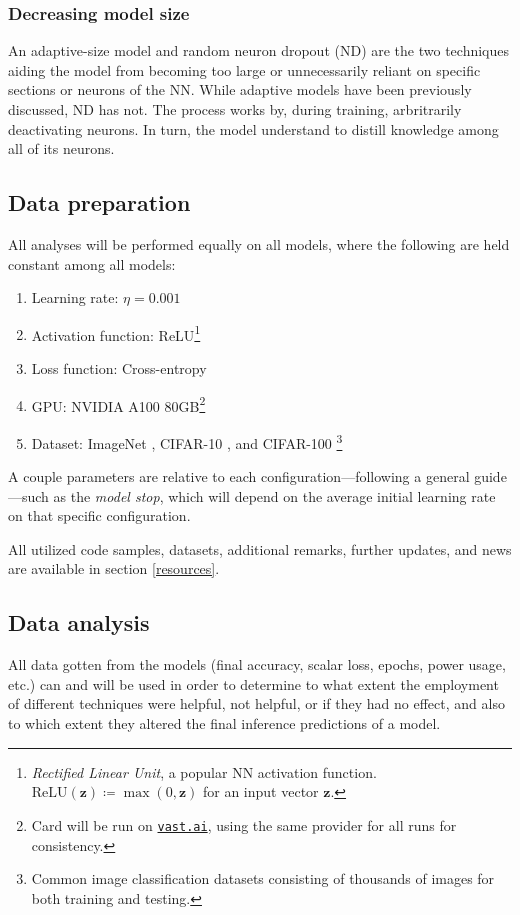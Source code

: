 \documentclass[conference]{IEEEtran}
\begin{document}
\subsubsection{Decreasing model size}
An adaptive-size model and random neuron dropout (ND) are the two techniques aiding the model from becoming too large or unnecessarily reliant on specific sections or neurons of the NN. While adaptive models have been previously discussed, ND has not. The process works by, during training, arbritrarily deactivating neurons. In turn, the model understand to distill knowledge among all of its neurons.

\subsection{Data preparation}

All analyses will be performed equally on all models, where the following are held constant among all models:

\begin{enumerate}
    \item Learning rate: $\eta=0.001$
    \item Activation function: ReLU\footnote{\textit{Rectified Linear Unit}, a popular NN activation function. $\text{ReLU}(\mathbf{z}) \coloneqq \max(0, \mathbf{z})$ for an input vector $\mathbf{z}$.}
    \item Loss function: Cross-entropy
    \item GPU: NVIDIA A100 80GB\footnote{Card will be run on \href{https://vast.ai}{\texttt{vast.ai}}, using the same provider for all runs for consistency.}
    \item Dataset: ImageNet \cite{imagenet}, CIFAR-10 \cite{cifar10}, and CIFAR-100 \cite{cifar100, krizhevsky2009}\footnote{Common image classification datasets consisting of thousands of images for both training and testing.}
\end{enumerate}

A couple parameters are relative to each configuration---following a general guide---such as the \textit{model stop}, which will depend on the average initial learning rate on that specific configuration.

All utilized code samples, datasets, additional remarks, further updates, and news are available in section \ref{resources}.

\subsection{Data analysis}
All data gotten from the models (final accuracy, scalar loss, epochs, power usage, etc.) can and will be used in order to determine to what extent the employment of different techniques were helpful, not helpful, or if they had no effect, and also to which extent they altered the final inference predictions of a model.
\end{document}
